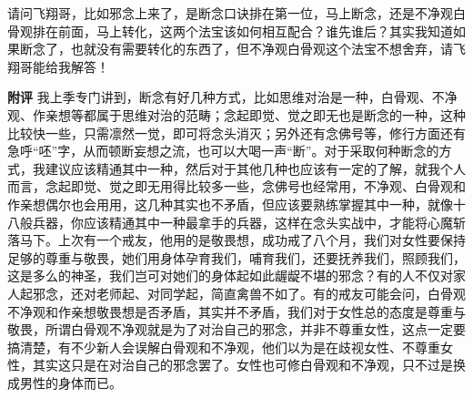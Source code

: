 \begin{case}
    请问飞翔哥，比如邪念上来了，是断念口诀排在第一位，马上断念，还是不净观白骨观排在前面，马上转化，这两个法宝该如何相互配合？谁先谁后？其实我知道如果断念了，也就没有需要转化的东西了，但不净观白骨观这个法宝不想舍弃，请飞翔哥能给我解答！

    \textbf{附评} 我上季专门讲到，断念有好几种方式，比如思维对治是一种，白骨观、不净观、作亲想等都属于思维对治的范畴；念起即觉、觉之即无也是断念的一种，这种比较快一些，只需凛然一觉，即可将念头消灭；另外还有念佛号等，修行方面还有急呼“呸”字，从而顿断妄想之流，也可以大喝一声“断”。对于采取何种断念的方式，我建议应该精通其中一种，然后对于其他几种也应该有一定的了解，就我个人而言，念起即觉、觉之即无用得比较多一些，念佛号也经常用，不净观、白骨观和作亲想偶尔也会用用，这几种其实也不矛盾，但应该要熟练掌握其中一种，就像十八般兵器，你应该精通其中一种最拿手的兵器，这样在念头实战中，才能将心魔斩落马下。上次有一个戒友，他用的是敬畏想，成功戒了八个月，我们对女性要保持足够的尊重与敬畏，她们用身体孕育我们，哺育我们，还要抚养我们，照顾我们，这是多么的神圣，我们岂可对她们的身体起如此龌龊不堪的邪念？有的人不仅对家人起邪念，还对老师起、对同学起，简直禽兽不如了。有的戒友可能会问，白骨观不净观和作亲想敬畏想是否矛盾，其实并不矛盾，我们对于女性总的态度是尊重与敬畏，所谓白骨观不净观就是为了对治自己的邪念，并非不尊重女性，这点一定要搞清楚，有不少新人会误解白骨观和不净观，他们以为是在歧视女性、不尊重女性，其实这只是在对治自己的邪念罢了。女性也可修白骨观和不净观，只不过是换成男性的身体而已。
\end{case}

